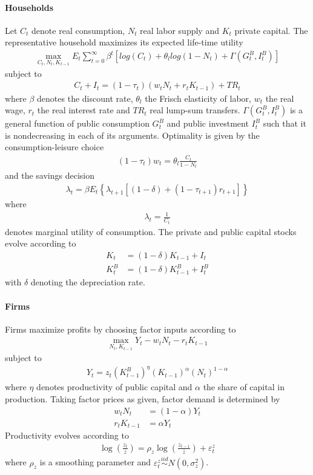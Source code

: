 \documentclass{article}
\begin{document}
\paragraph*{Households}
Let $C_t$ denote real consumption, $N_t$ real labor supply and $K_t$ private capital. The representative household maximizes its expected life-time utility
\begin{align*}
  \max_{C_t,N_t,K_{t-1}} E_t \sum_{t=0}^\infty \beta^t \left[log(C_t)+\theta_l log(1-N_t) + \Gamma(G_t^B,I_t^B)\right]
\end{align*}
subject to
\begin{align*}
  C_t + I_t = (1-\tau_t)(w_t N_t+r_t K_{t-1}) + {TR}_t
\end{align*}
where $\beta$ denotes the discount rate, $\theta_l$ the Frisch elasticity of labor, $w_t$ the real wage, $r_t$ the real interest rate and $TR_t$ real lump-sum transfers. $\Gamma(G_t^B,I_t^B)$ is a general function of public consumption $G_t^B$ and public investment $I_t^B$ such that it is nondecreasing in each of its arguments. Optimality is given by the consumption-leisure choice
\begin{align}
  (1-\tau_t) w_t = \theta_l \frac{C_t}{1-N_t}
\end{align}
and the savings decision
\begin{align}
  \lambda_t = \beta E_t \left\{\lambda_{t+1}\left[(1-\delta) + (1-\tau_{t+1})r_{t+1}\right]\right\}
\end{align}
where
\begin{align}
  \lambda_t = \frac{1}{C_t}
\end{align}
denotes marginal utility of consumption.
The private and public capital stocks evolve according to
\begin{align}
  K_{t} &= (1-\delta)K_{t-1} + I_t\\
  K_{t}^B &= (1-\delta)K_{t-1}^B + I_t^B
\end{align}
with $\delta$ denoting the depreciation rate.
\paragraph*{Firms}
Firms maximize profits by choosing factor inputs according to
\begin{align*}
  \max_{N_t,K_{t-1}} Y_t - w_t N_t - r_t K_{t-1}
\end{align*}
subject to
\begin{align}
  Y_t = z_t (K_{t-1}^B)^\eta (K_{t-1})^\alpha (N_t)^{1-\alpha}
\end{align}
where $\eta$ denotes productivity of public capital and $\alpha$ the share of capital in production. Taking factor prices as given, factor demand is determined by
\begin{align}
  w_t N_t &= (1-\alpha) Y_t\\
  r_t K_{t-1}&= \alpha Y_t
\end{align}
Productivity evolves according to
\begin{align}
  \log\left(\frac{z_t}{\bar{z}}\right) = \rho_z \log\left(\frac{z_{t-1}}{\bar{z}}\right) +   \varepsilon_t^z
\end{align}
where $\rho_z$ is a smoothing parameter and $\varepsilon_t^{z}\overset{iid}{\sim} N(0,\sigma_{z}^2)$.
\end{document}
